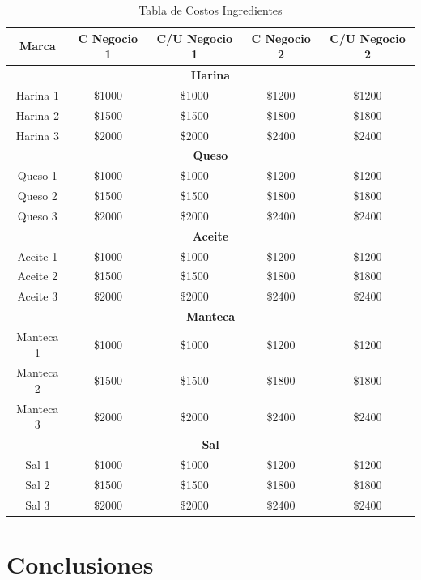 \documentclass[12pt]{article}
\begin{document}
\begin{table}[h!]
    \centering
    \begin{tabular}{|| c | c | c | c | c||} %
        \hline
        \textbf{Marca} & \textbf{C Negocio 1} & \textbf{C/U Negocio 1} & \textbf{C Negocio 2} & \textbf{C/U Negocio 2} \\ [0.5ex]
        \hline\hline

        \multicolumn{5}{||c||}{\textbf{Harina}} \\ [0.5ex] \hline \hline
        Harina 1 & \$1000 & \$1000 & \$1200 & \$1200 \\ \hline
        Harina 2 & \$1500 & \$1500 & \$1800 & \$1800 \\ \hline
        Harina 3 & \$2000 & \$2000 & \$2400 & \$2400 \\ [1ex] \hline \hline

        \multicolumn{5}{||c||}{\textbf{Queso}} \\ [0.5ex] \hline \hline
        Queso 1 & \$1000 & \$1000 & \$1200 & \$1200 \\ \hline
        Queso 2 & \$1500 & \$1500 & \$1800 & \$1800 \\ \hline
        Queso 3 & \$2000 & \$2000 & \$2400 & \$2400 \\ [1ex] \hline \hline

        \multicolumn{5}{||c||}{\textbf{Aceite}} \\ [0.5ex] \hline \hline
        Aceite 1 & \$1000 & \$1000 & \$1200 & \$1200 \\ \hline
        Aceite 2 & \$1500 & \$1500 & \$1800 & \$1800 \\ \hline
        Aceite 3 & \$2000 & \$2000 & \$2400 & \$2400 \\ [1ex] \hline \hline

        \multicolumn{5}{||c||}{\textbf{Manteca}} \\ [0.5ex] \hline \hline
        Manteca 1 & \$1000 & \$1000 & \$1200 & \$1200 \\ \hline
        Manteca 2 & \$1500 & \$1500 & \$1800 & \$1800 \\ \hline
        Manteca 3 & \$2000 & \$2000 & \$2400 & \$2400 \\ [1ex] \hline \hline

        \multicolumn{5}{||c||}{\textbf{Sal}} \\ [0.5ex] \hline \hline
        Sal 1 & \$1000 & \$1000 & \$1200 & \$1200 \\ \hline
        Sal 2 & \$1500 & \$1500 & \$1800 & \$1800 \\ \hline
        Sal 3 & \$2000 & \$2000 & \$2400 & \$2400 \\ [1ex] \hline \hline

    \end{tabular}
    \caption{Tabla de Costos Ingredientes}
    \label{tab:costos_masas}
\end{table}

\newpage



\section{Conclusiones} %
\end{document}
